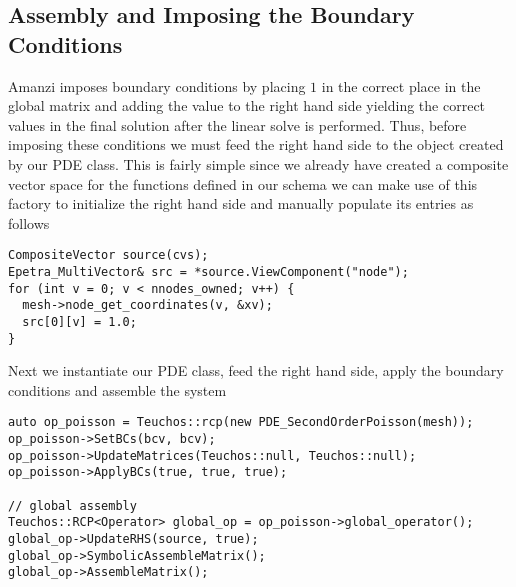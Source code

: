 \subsection{Assembly and Imposing the Boundary Conditions}\label{Sec:AssemblyAndBoundaryCond}
%
Amanzi imposes boundary conditions by placing $1$ in the correct place in the global matrix and adding the value to the right hand side yielding the correct values in the final solution after the linear solve is performed. Thus, before imposing these conditions we must feed the right hand side to the object created by our PDE class. This is fairly simple since we already have created a composite vector space for the functions defined in our schema we can make use of this factory to initialize the right hand side and manually populate its entries as follows
%
\begin{lstlisting}
CompositeVector source(cvs);
Epetra_MultiVector& src = *source.ViewComponent("node");
for (int v = 0; v < nnodes_owned; v++) {
  mesh->node_get_coordinates(v, &xv);
  src[0][v] = 1.0;
}
\end{lstlisting}
%
Next we instantiate our PDE class, feed the right hand side, apply the boundary conditions and assemble the system
%
\begin{lstlisting}
auto op_poisson = Teuchos::rcp(new PDE_SecondOrderPoisson(mesh));
op_poisson->SetBCs(bcv, bcv);
op_poisson->UpdateMatrices(Teuchos::null, Teuchos::null);
op_poisson->ApplyBCs(true, true, true);

// global assembly
Teuchos::RCP<Operator> global_op = op_poisson->global_operator();
global_op->UpdateRHS(source, true);
global_op->SymbolicAssembleMatrix();
global_op->AssembleMatrix();
\end{lstlisting}
%

